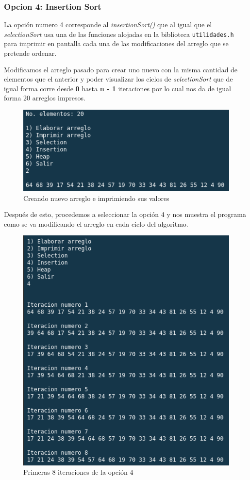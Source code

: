 \documentclass{article}
\begin{document}
			\subsubsection{Opcion 4: Insertion Sort}
			
			La opción numero 4 corresponde al \emph{insertionSort()} que al igual que el \emph{selectionSort} usa una de las funciones alojadas en la biblioteca \verb*|utilidades.h| para imprimir en pantalla cada una de las modificaciones del arreglo que se pretende ordenar.
			
			Modificamos el arreglo pasado para crear uno nuevo con la misma cantidad de elementos que el anterior y poder visualizar los ciclos de \emph{selectionSort} que de igual forma corre desde \textbf{0} hasta \textbf{n - 1} iteraciones por lo cual nos da de igual forma 20 arreglos impresos.
			
			\begin{figure}[H]
				\centering
				\includegraphics[scale = 0.8]{images/e2-4-1}
				\caption{Creando nuevo arreglo e imprimiendo sus valores}
			\end{figure}
			\newpage
		
			Después de esto, procedemos a seleccionar la opción 4 y nos muestra el programa como se va modificando el arreglo en cada ciclo del algoritmo.
			
			\begin{figure}[H]
				\centering
				\includegraphics[scale = 0.8]{images/e2-4-2}
				\caption{Primeras 8 iteraciones de la opción 4}
			\end{figure}
		
\end{document}
